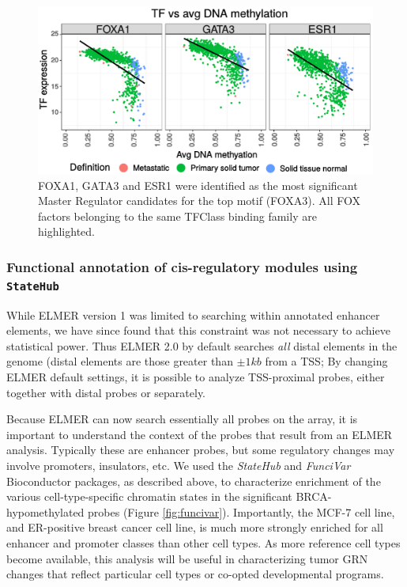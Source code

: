 \begin{figure}
\centering
\includegraphics[width=1.0\textwidth]{images/scatter_font.pdf}
\caption[FOXA1, GATA3 and ESR1 expression vs average DNA methylation at probes with FOXA3 motif]{\label{fig:scatter} FOXA1, GATA3 and ESR1 were identified as the most significant Master Regulator candidates for the top motif (FOXA3). All FOX factors belonging to the same TFClass binding family are highlighted.}
\end{figure}


\subsubsection*{Functional annotation of cis-regulatory modules using \texttt{StateHub}}
While ELMER version 1 was limited to searching within annotated enhancer elements, we have since found that this constraint was not necessary to achieve statistical power. Thus ELMER 2.0 by default searches \textit{all} distal elements in the genome (distal elements are those greater than $\pm1 kb$ from a TSS; By changing ELMER default settings, it is possible to analyze TSS-proximal probes, either together with distal probes or separately.

Because ELMER can now search essentially all probes on the array, it is important to understand the context of the probes that result from an ELMER analysis. Typically these are enhancer probes, but some regulatory changes may involve promoters, insulators, etc. We used the \textit{StateHub} \cite{statepaintr} and \textit{FunciVar} Bioconductor packages, as described above, to characterize enrichment of the various cell-type-specific chromatin states in the significant BRCA-hypomethylated probes (Figure \ref{fig:funcivar}). Importantly, the MCF-7 cell line, and ER-positive breast cancer cell line, is much more strongly enriched for all enhancer and promoter classes than other cell types. As more reference cell types become available, this analysis will be useful in characterizing tumor GRN changes that reflect particular cell types or co-opted developmental programs.

